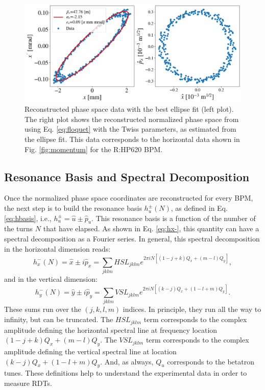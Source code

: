\begin{figure}[H]
    \centering
    \includegraphics[width=\columnwidth]{chapter4/ellipse_data.png}
    \caption{Reconstructed phase space data with the best ellipse fit (left plot). The right plot shows the reconstructed normalized phase space from using Eq. \ref{eq:floquet} with the Twiss parameters, as estimated from the ellipse fit. This data corresponds to the horizontal data shown in Fig. \ref{fig:momentum} for the R:HP620 BPM.}
    \label{fig:ellipse}
\end{figure}

\subsection{Resonance Basis and Spectral Decomposition}

Once the normalized phase space coordinates are reconstructed for every BPM, the next step is to build the resonance basis $h_u^{\pm}(N)$, as defined in Eq. \ref{eq:hbasis}, i.e., $h_u^{\pm}=\hat{u}\pm \hat{p}_u$. This resonance basis is a function of the number of the turns $N$ that have elapsed. As shown in Eq. \ref{eq:hx-}, this quantity can have a spectral decomposition as a Fourier series. In general, this spectral decomposition in the horizontal dimension reads: 
\begin{equation}
    \label{eq:hxspect}
    h_x^{-}(N)= \hat{x} \pm i\hat{p}_x = \sum_{jklm}HSL_{jklm}e^{2\pi i N \left[ \left( 1-j+k\right)Q_x+\left( m-l \right)Q_y\right]},
\end{equation}
and in the vertical dimension:
\begin{equation}
    \label{eq:hyspect}
    h_y^{-}(N)= \hat{y} \pm i\hat{p}_y = \sum_{jklm}VSL_{jklm}e^{2\pi i N \left[ \left( k-j\right)Q_x+\left(1-l+m \right)Q_y\right]}.
\end{equation}
These sums run over the $(j,k,l,m)$ indices. In principle, they run all the way to infinity, but can be truncated. The $HSL_{jklm}$ term corresponds to the complex amplitude defining the horizontal spectral line at frequency location $(1-j+k)Q_x+(m-l)Q_y$. The $VSL_{jklm}$ term corresponds to the complex amplitude defining the vertical spectral line at location $(k-j)Q_x+(1-l+m)Q_y$. And, as always, $Q_u$ corresponds to the betatron tunes. These definitions help to understand the experimental data in order to measure RDTs.

